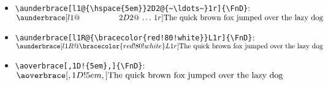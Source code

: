 \documentclass[10pt]{ltxdockit}[2011/03/25]
\begin{document}
\begin{itemize}
  \item \lstinline!\aunderbrace[l1@{\hspace{5em}}2D2@{~\ldots~}1r]{\FnD}!: \\
    $\aunderbrace[l1@{\hspace{5em}}2D2@{~\ldots~}1r]{\FnD}$
    
  \item \lstinline~\aunderbrace[l1R@{\bracecolor{red!80!white}}L1r]{\FnD}~: \\
    $\aunderbrace[l1R@{\bracecolor{red!80!white}}L1r]{\FnD}$
    
  \item \lstinline~\aoverbrace[,1D!{5em},]{\FnD}~: \\
    $\aoverbrace[,1D!{5em},]{\FnD}$
\end{itemize}
\end{document}
